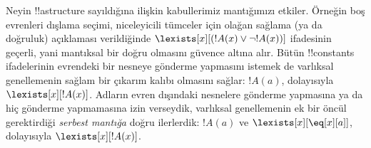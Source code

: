 \begin{digress}
Neyin !!a{structure} sayıldığına ilişkin kabullerimiz mantığımızı
etkiler. Örneğin boş evrenleri dışlama seçimi, niceleyicili tümceler
için olağan sağlama (ya da doğruluk) açıklaması verildiğinde
$\lexists[x][(!A(x)\lor\lnot !A(x))]$ ifadesinin geçerli, yani
mantıksal bir doğru olmasını güvence altına alır. Bütün !!{constant}s
ifadelerinin evrendeki bir nesneye gönderme yapmasını istemek de
varlıksal genellemenin sağlam bir çıkarım kalıbı olmasını sağlar:
$!A(a)$, dolayısıyla $\lexists[x][!A(x)]$. Adların evren dışındaki
nesnelere gönderme yapmasına ya da hiç gönderme yapmamasına izin
verseydik, varlıksal genellemenin ek bir öncül gerektirdiği
\emph{serbest mantığa} doğru ilerlerdik: $!A(a)$ ve
$\lexists[x][\eq[x][a]]$, dolayısıyla $\lexists[x][!A(x)]$.
\end{digress}

